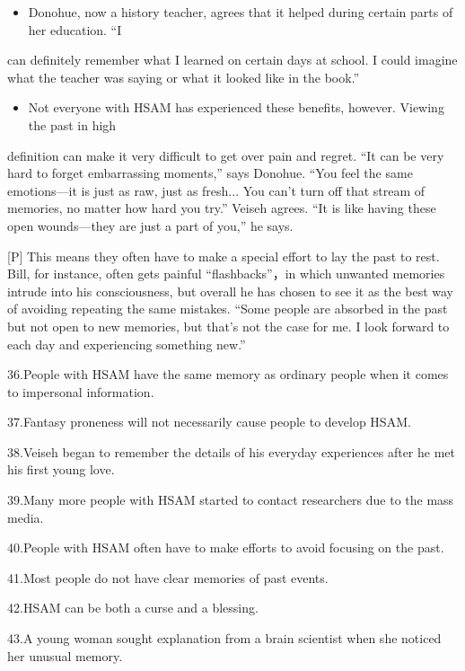 \documentclass[UTF8,11pt]{ctexart}
\begin{document}
\begin{itemize}[leftmargin=2em,itemsep=.2em,topsep=.4em]\item[N.] Donohue, now a history teacher, agrees that it helped during certain parts of her education. “I
\end{itemize}

can definitely remember what I learned on certain days at school. I could imagine what the teacher was saying or what it looked like in the book.”


\begin{itemize}[leftmargin=2em,itemsep=.2em,topsep=.4em]\item[O.] Not everyone with HSAM has experienced these benefits, however. Viewing the past in high
\end{itemize}

definition can make it very difficult to get over pain and regret. “It can be very hard to forget embarrassing moments,” says Donohue. “You feel the same emotions—it is just as raw, just as fresh... You can’t turn off that stream of memories, no matter how hard you try.” Veiseh agrees. “It is like having these open wounds—they are just a part of you,” he says.


[P] This means they often have to make a special effort to lay the past to rest. Bill, for instance, often gets painful “flashbacks”，in which unwanted memories intrude into his consciousness, but overall he has chosen to see it as the best way of avoiding repeating the same mistakes. “Some people are absorbed in the past but not open to new memories, but that’s not the case for me. I look forward to each day and experiencing something new.”


36.People with HSAM have the same memory as ordinary people when it comes to impersonal information.


37.Fantasy proneness will not necessarily cause people to develop HSAM.


38.Veiseh began to remember the details of his everyday experiences after he met his first young love.


39.Many more people with HSAM started to contact researchers due to the mass media.


40.People with HSAM often have to make efforts to avoid focusing on the past.


41.Most people do not have clear memories of past events.


42.HSAM can be both a curse and a blessing.


43.A young woman sought explanation from a brain scientist when she noticed her unusual memory.
\end{document}
